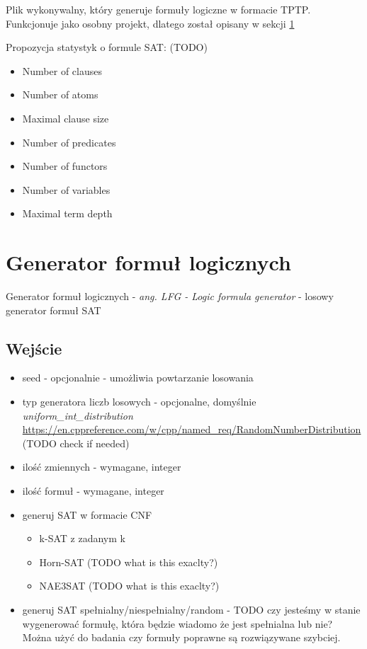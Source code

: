 \documentclass[a4paper,12pt]{article}
\begin{document}
Plik wykonywalny, który generuje formuły logiczne w formacie TPTP. Funkcjonuje jako osobny projekt, dlatego został opisany w sekcji \ref{LFG}

Propozycja statystyk o formule SAT: (TODO)

\begin{itemize}
  \item Number of clauses
  \item Number of atoms
  \item Maximal clause size
  \item Number of predicates
  \item Number of functors
  \item Number of variables
  \item Maximal term depth
\end{itemize}

\section{Generator formuł logicznych}\label{LFG}

Generator formuł logicznych - \textit{ang. LFG - Logic formula generator} - losowy generator formuł SAT

\subsection{Wejście}

\begin{itemize}
  \item seed - opcjonalnie - umożliwia powtarzanie losowania
  \item typ generatora liczb losowych - opcjonalne, domyślnie \textit{uniform\_int\_distribution} \url{https://en.cppreference.com/w/cpp/named_req/RandomNumberDistribution} (TODO check if needed)
  \item ilość zmiennych - wymagane, integer
  \item ilość formuł - wymagane, integer
  \item generuj \gls{SAT} w formacie \gls{CNF}
    \begin{itemize}
      \item k-SAT z zadanym k
      \item Horn-SAT (TODO what is this exaclty?)
      \item NAE3SAT (TODO what is this exaclty?)
    \end{itemize}
  \item generuj \gls{SAT} spełnialny/niespełnialny/random - TODO czy jesteśmy w stanie wygenerować formułę, która będzie wiadomo że jest spełnialna lub nie? Można użyć do badania czy formuły poprawne są rozwiązywane szybciej.
\end{itemize}
\end{document}
